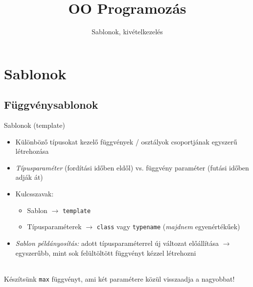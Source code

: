 \documentclass[usenames,dvipsnames,aspectratio=169]{beamer}
\title[OO Programozás - C++]{OO Programozás}
\subtitle{Sablonok, kivételkezelés}
\begin{document}
\begin{frame}[plain]
  \titlepage
  \logoalul
\end{frame}

\section{Sablonok}

\subsection{Függvénysablonok}

\begin{frame}
    Sablonok (template)
    \begin{itemize}
        \item Különböző típusokat kezelő függvények / osztályok csoportjának egyszerű létrehozása
        \item \emph{Típusparaméter} (fordítási időben eldől) vs. függvény paraméter (futási időben adják át)
        \item Kulcsszavak:
        \begin{itemize}
            \item Sablon $\to$ \texttt{template}
            \item Típusparaméterek $\to$ \texttt{class} vagy \texttt{typename} (\emph{majdnem} egyenértékűek)
        \end{itemize}
        \item \emph{Sablon példányosítás:} adott típusparaméterrel új változat előállítása $\to$ egyszerűbb, mint sok felültöltött függvényt kézzel létrehozni
    \end{itemize}
    \vfill
    \begin{description}[m]
        \item[Feladat:] \hfill \\ Készítsünk \texttt{max} függvényt, ami két paramétere közül visszaadja a nagyobbat!
    \end{description}
\end{frame}

\begin{frame}
    \begin{exampleblock}{}
        
    \end{exampleblock}
\end{frame}
\end{document}
